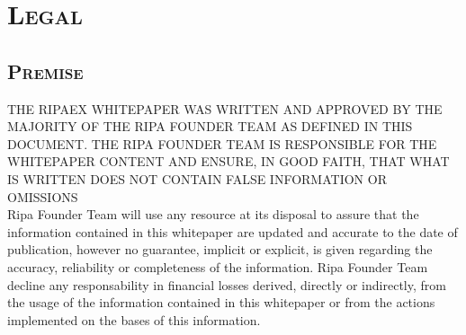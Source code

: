 

\chapter{\textsc{Legal}}
\begin{scriptsize}
	{\scshape
		\section{\textsc{Premise}}
		\textsc{THE RIPAEX WHITEPAPER WAS WRITTEN AND APPROVED BY THE MAJORITY OF THE RIPA FOUNDER TEAM AS 
		DEFINED IN THIS DOCUMENT. THE RIPA FOUNDER TEAM IS RESPONSIBLE FOR THE WHITEPAPER CONTENT AND ENSURE, 
		IN GOOD FAITH, THAT WHAT IS WRITTEN DOES NOT CONTAIN FALSE INFORMATION OR OMISSIONS}\\
		Ripa Founder Team will use any resource at its disposal to assure that the information contained in this 
		whitepaper are updated and accurate to the date of publication, however no guarantee, implicit or explicit, 
		is given regarding the accuracy, reliability or completeness of the information. Ripa Founder Team decline 
		any responsability in financial losses derived, directly or indirectly, from the usage of the information
		contained in this whitepaper or from the actions implemented on the bases of this information.
}
\end{scriptsize}

